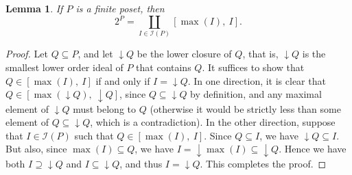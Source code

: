 \documentclass[noamsfonts,10pt]{amsart}
\newcommand{\I}{\mathcal{I}}
\newcommand{\1}{\mathbf{1}}
\theoremstyle{plain}
\newtheorem{lemma}[theorem]{Lemma}
\theoremstyle{definition}
\numberwithin{equation}{section}
\begin{document}
\begin{lemma}
    \label{lemma:poset partition}
    If $P$ is a finite poset, then
    \[
        2^P = \coprod_{I \in \I(P)} [ \max(I), \: I].
    \]
\end{lemma}

\begin{proof}
    Let $Q \subseteq P$, and let ${\downarrow \!\! Q}$ be the lower closure of $Q$, that is, $\downarrow Q$ is the smallest lower order ideal of $P$ that contains $Q$.
    It suffices to show that $Q \in [\max(I), \: I]$ if and only if $I = {\downarrow \!\! Q}$.
    In one direction, it is clear that $Q \in [\max(\downarrow \! \! Q), \: \downarrow \!\! Q]$, since $Q \subseteq \downarrow \!\! Q$ by definition, and any maximal element of $\downarrow \!\! Q$ must belong to $Q$ (otherwise it would be strictly less than some element of $Q \subseteq \downarrow\!\!Q$, which is a contradiction).
    In the other direction, suppose that $I \in \I(P)$ such that $Q \in [\max(I), \: I]$.
    Since $Q \subseteq I$, we have $\downarrow \!\! Q \subseteq I$.
    But also, since $\max(I) \subseteq Q$, we have $I = \downarrow\!\!\max(I) \subseteq \downarrow\!\! Q$.
    Hence we have both $I \supseteq \downarrow\!\! Q$ and $I \subseteq \downarrow \!\! Q$, and thus $I = \downarrow \!\! Q$.
    This completes the proof.
\end{proof}
\end{document}

